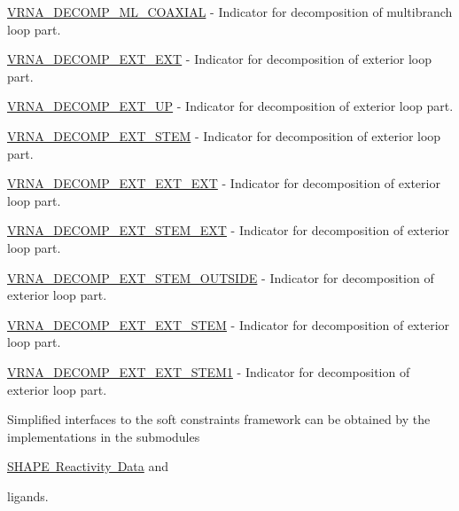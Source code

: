 \begin{DoxyItemize}
\item \mbox{\hyperlink{group__constraints_ga4fe48d575830b16c208e280e01ab1497}{V\+R\+N\+A\+\_\+\+D\+E\+C\+O\+M\+P\+\_\+\+M\+L\+\_\+\+C\+O\+A\+X\+I\+AL}} -\/ Indicator for decomposition of multibranch loop part.
\item \mbox{\hyperlink{group__constraints_ga437adf5115c1999304eff26b41e4c9b6}{V\+R\+N\+A\+\_\+\+D\+E\+C\+O\+M\+P\+\_\+\+E\+X\+T\+\_\+\+E\+XT}} -\/ Indicator for decomposition of exterior loop part.
\item \mbox{\hyperlink{group__constraints_gaff1ddaffe86d984623910b40cc8a8717}{V\+R\+N\+A\+\_\+\+D\+E\+C\+O\+M\+P\+\_\+\+E\+X\+T\+\_\+\+UP}} -\/ Indicator for decomposition of exterior loop part.
\item \mbox{\hyperlink{group__constraints_gae44b5ace0d9b4a29088069ecb4cec441}{V\+R\+N\+A\+\_\+\+D\+E\+C\+O\+M\+P\+\_\+\+E\+X\+T\+\_\+\+S\+T\+EM}} -\/ Indicator for decomposition of exterior loop part.
\item \mbox{\hyperlink{group__constraints_ga803bd818b3f4b2b0a4a5cfa2f7dc2045}{V\+R\+N\+A\+\_\+\+D\+E\+C\+O\+M\+P\+\_\+\+E\+X\+T\+\_\+\+E\+X\+T\+\_\+\+E\+XT}} -\/ Indicator for decomposition of exterior loop part.
\item \mbox{\hyperlink{group__constraints_gabb09c5b78b75a44502fc77b950125c1e}{V\+R\+N\+A\+\_\+\+D\+E\+C\+O\+M\+P\+\_\+\+E\+X\+T\+\_\+\+S\+T\+E\+M\+\_\+\+E\+XT}} -\/ Indicator for decomposition of exterior loop part.
\item \mbox{\hyperlink{group__constraints_gae7554cd3ff089360c02e4920229e221c}{V\+R\+N\+A\+\_\+\+D\+E\+C\+O\+M\+P\+\_\+\+E\+X\+T\+\_\+\+S\+T\+E\+M\+\_\+\+O\+U\+T\+S\+I\+DE}} -\/ Indicator for decomposition of exterior loop part.
\item \mbox{\hyperlink{group__constraints_ga06efd054c9271438f6d82d4559d9e69f}{V\+R\+N\+A\+\_\+\+D\+E\+C\+O\+M\+P\+\_\+\+E\+X\+T\+\_\+\+E\+X\+T\+\_\+\+S\+T\+EM}} -\/ Indicator for decomposition of exterior loop part.
\item \mbox{\hyperlink{group__constraints_ga2e75d7a77118735b32f25422d9686719}{V\+R\+N\+A\+\_\+\+D\+E\+C\+O\+M\+P\+\_\+\+E\+X\+T\+\_\+\+E\+X\+T\+\_\+\+S\+T\+E\+M1}} -\/ Indicator for decomposition of exterior loop part.
\end{DoxyItemize}

Simplified interfaces to the soft constraints framework can be obtained by the implementations in the submodules


\begin{DoxyItemize}
\item \mbox{\hyperlink{group__SHAPE__reactivities}{S\+H\+A\+PE Reactivity Data}} and
\item ligands.
\end{DoxyItemize}

